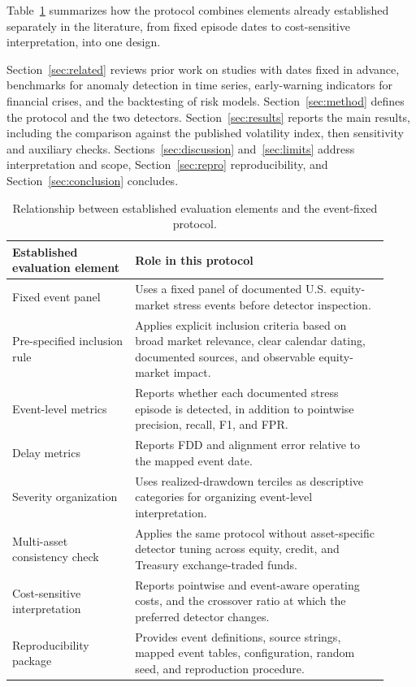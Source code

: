 \documentclass[pdflatex,sn-mathphys-num,iicol]{sn-jnl}
\begin{document}
Table~\ref{tab:protocol_comparison} summarizes how the protocol combines elements already established separately in the literature, from fixed episode dates to cost-sensitive interpretation, into one design.

Section~\ref{sec:related} reviews prior work on studies with dates fixed in advance, benchmarks for anomaly detection in time series, early-warning indicators for financial crises, and the backtesting of risk models. Section~\ref{sec:method} defines the protocol and the two detectors. Section~\ref{sec:results} reports the main results, including the comparison against the published volatility index, then sensitivity and auxiliary checks. Sections~\ref{sec:discussion} and~\ref{sec:limits} address interpretation and scope, Section~\ref{sec:repro} reproducibility, and Section~\ref{sec:conclusion} concludes.

\begin{table}[t]
\centering
\caption{Relationship between established evaluation elements and the event-fixed protocol.}
\label{tab:protocol_comparison}
\scriptsize
\begin{tabular}{p{0.30\linewidth}p{0.62\linewidth}}
\toprule
Established evaluation element & Role in this protocol\\
\midrule
Fixed event panel & Uses a fixed panel of documented U.S. equity-market stress events before detector inspection.\\
Pre-specified inclusion rule & Applies explicit inclusion criteria based on broad market relevance, clear calendar dating, documented sources, and observable equity-market impact.\\
Event-level metrics & Reports whether each documented stress episode is detected, in addition to pointwise precision, recall, F1, and FPR.\\
Delay metrics & Reports FDD and alignment error relative to the mapped event date.\\
Severity organization & Uses realized-drawdown terciles as descriptive categories for organizing event-level interpretation.\\
Multi-asset consistency check & Applies the same protocol without asset-specific detector tuning across equity, credit, and Treasury exchange-traded funds.\\
Cost-sensitive interpretation & Reports pointwise and event-aware operating costs, and the crossover ratio at which the preferred detector changes.\\
Reproducibility package & Provides event definitions, source strings, mapped event tables, configuration, random seed, and reproduction procedure.\\
\bottomrule
\end{tabular}
\end{table}
\end{document}
